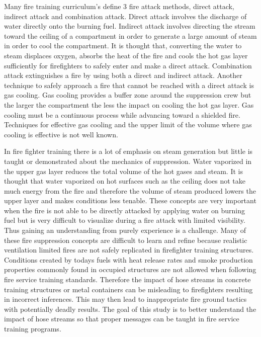 \documentclass[12pt,oneside]{book}
\begin{document}
Many fire training curriculum's define 3 fire attack methods, direct attack, indirect attack and combination attack. Direct attack involves the discharge of water directly onto the burning fuel. Indirect attack involves directing the stream toward the ceiling of a compartment in order to generate a large amount of steam in order to cool the compartment. It is thought that, converting the water to steam displaces oxygen, absorbs the heat of the fire and cools the hot gas layer sufficiently for firefighters to safely enter and make a direct attack. Combination attack extinguishes a fire by using both a direct and indirect attack. Another technique to safely approach a fire that cannot be reached with a direct attack is gas cooling. Gas cooling provides a buffer zone around the suppression crew but the larger the compartment the less the impact on cooling the hot gas layer. Gas cooling must be a continuous process while advancing toward a shielded fire. Techniques for effective gas cooling and the upper limit of the volume where gas cooling is effective is not well known.  

In fire fighter training there is a lot of emphasis on steam generation but little is taught or demonstrated about the mechanics of suppression. Water vaporized in the upper gas layer reduces the total volume of the hot gases and steam. It is thought that water vaporized on hot surfaces such as the ceiling does not take much energy from the fire and therefore the volume of steam produced lowers the upper layer and makes conditions less tenable. These concepts are very important when the fire is not able to be directly attacked by applying water on burning fuel but is very difficult to visualize during a fire attack with limited visibility. Thus gaining an understanding from purely experience is a challenge. Many of these fire suppression concepts are difficult to learn and refine because realistic ventilation limited fires are not safely replicated in firefighter training structures. Conditions created by todays fuels with heat release rates and smoke production properties commonly found in occupied structures are not allowed when following fire service training standards. Therefore the impact of hose streams in concrete training structures or metal containers can be misleading to firefighters resulting in incorrect inferences. This may then lead to inappropriate fire ground tactics with potentially deadly results. The goal of this study is to better understand the impact of hose streams so that proper messages can be taught in fire service training programs.  
\end{document}
